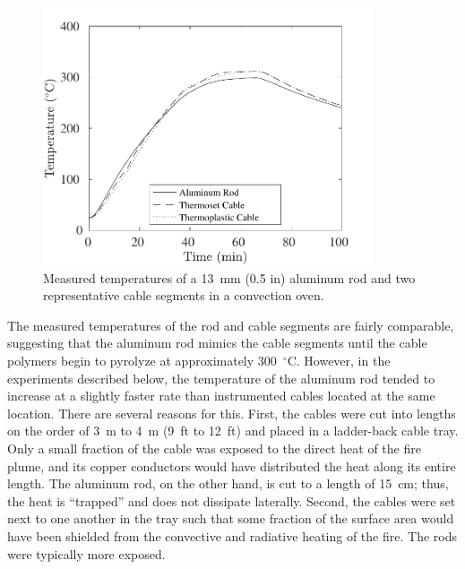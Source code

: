 \begin{figure}[!ht]
\centering
\includegraphics[height=3.0in]{../SCRIPT_FIGURES/Oven_Test}
\caption[Temperatures of cables and aluminum rod in convective oven]{Measured temperatures of a 13~mm (0.5 in) aluminum rod and two representative cable segments in a convection oven.}
\label{oven}
\end{figure}

The measured temperatures of the rod and cable segments are fairly comparable, suggesting that the aluminum rod mimics the cable segments until the cable polymers begin to pyrolyze at approximately 300~$^\circ$C. However, in the experiments described below, the temperature of the aluminum rod tended to increase at a slightly faster rate than instrumented cables located at the same location. There are several reasons for this. First, the cables were cut into lengths on the order of 3~m to 4~m (9~ft to 12~ft) and placed in a ladder-back cable tray. Only a small fraction of the cable was exposed to the direct heat of the fire plume, and its copper conductors would have distributed the heat along its entire length. The aluminum rod, on the other hand, is cut to a length of 15~cm; thus, the heat is ``trapped'' and does not dissipate laterally. Second, the cables were set next to one another in the tray such that some fraction of the surface area would have been shielded from the convective and radiative heating of the fire. The rods were typically more exposed.

